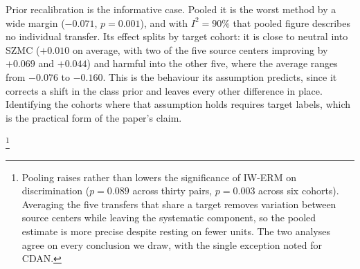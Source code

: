 Prior recalibration is the informative case. Pooled it is the worst method by a
wide margin ($-0.071$, $p=0.001$), and with $I^2=90\%$ that pooled figure
describes no individual transfer. Its effect splits by target cohort: it is
close to neutral into SZMC ($+0.010$ on average, with two of the five source
centers improving by $+0.069$ and $+0.044$) and harmful into the other five,
where the average ranges from $-0.076$ to $-0.160$. This is the behaviour its
assumption predicts, since it corrects a shift in the class prior and leaves
every other difference in place. Identifying the cohorts where that assumption
holds requires target labels, which is the practical form of the paper's claim.

\footnote{Pooling raises rather than lowers the significance of IW-ERM on
discrimination ($p=0.089$ across thirty pairs, $p=0.003$ across six cohorts).
Averaging the five transfers that share a target removes variation between
source centers while leaving the systematic component, so the pooled estimate is
more precise despite resting on fewer units. The two analyses agree on every
conclusion we draw, with the single exception noted for CDAN.}
